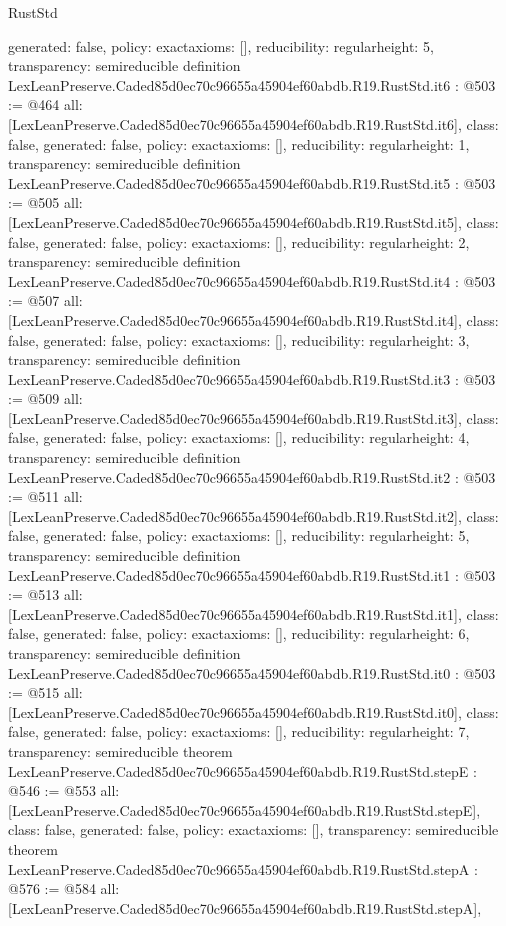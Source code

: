\begin{lexlean}{RustStd}
\begin{coremodule}
{  generated: false,
  policy: exact{axioms: []},
  reducibility: regular{height: 5},
  transparency: semireducible
}
definition LexLeanPreserve.Caded85d0ec70c96655a45904ef60abdb.R19.RustStd.it6 : @503 := @464 {
  all: [LexLeanPreserve.Caded85d0ec70c96655a45904ef60abdb.R19.RustStd.it6],
  class: false,
  generated: false,
  policy: exact{axioms: []},
  reducibility: regular{height: 1},
  transparency: semireducible
}
definition LexLeanPreserve.Caded85d0ec70c96655a45904ef60abdb.R19.RustStd.it5 : @503 := @505 {
  all: [LexLeanPreserve.Caded85d0ec70c96655a45904ef60abdb.R19.RustStd.it5],
  class: false,
  generated: false,
  policy: exact{axioms: []},
  reducibility: regular{height: 2},
  transparency: semireducible
}
definition LexLeanPreserve.Caded85d0ec70c96655a45904ef60abdb.R19.RustStd.it4 : @503 := @507 {
  all: [LexLeanPreserve.Caded85d0ec70c96655a45904ef60abdb.R19.RustStd.it4],
  class: false,
  generated: false,
  policy: exact{axioms: []},
  reducibility: regular{height: 3},
  transparency: semireducible
}
definition LexLeanPreserve.Caded85d0ec70c96655a45904ef60abdb.R19.RustStd.it3 : @503 := @509 {
  all: [LexLeanPreserve.Caded85d0ec70c96655a45904ef60abdb.R19.RustStd.it3],
  class: false,
  generated: false,
  policy: exact{axioms: []},
  reducibility: regular{height: 4},
  transparency: semireducible
}
definition LexLeanPreserve.Caded85d0ec70c96655a45904ef60abdb.R19.RustStd.it2 : @503 := @511 {
  all: [LexLeanPreserve.Caded85d0ec70c96655a45904ef60abdb.R19.RustStd.it2],
  class: false,
  generated: false,
  policy: exact{axioms: []},
  reducibility: regular{height: 5},
  transparency: semireducible
}
definition LexLeanPreserve.Caded85d0ec70c96655a45904ef60abdb.R19.RustStd.it1 : @503 := @513 {
  all: [LexLeanPreserve.Caded85d0ec70c96655a45904ef60abdb.R19.RustStd.it1],
  class: false,
  generated: false,
  policy: exact{axioms: []},
  reducibility: regular{height: 6},
  transparency: semireducible
}
definition LexLeanPreserve.Caded85d0ec70c96655a45904ef60abdb.R19.RustStd.it0 : @503 := @515 {
  all: [LexLeanPreserve.Caded85d0ec70c96655a45904ef60abdb.R19.RustStd.it0],
  class: false,
  generated: false,
  policy: exact{axioms: []},
  reducibility: regular{height: 7},
  transparency: semireducible
}
theorem LexLeanPreserve.Caded85d0ec70c96655a45904ef60abdb.R19.RustStd.stepE : @546 := @553 {
  all: [LexLeanPreserve.Caded85d0ec70c96655a45904ef60abdb.R19.RustStd.stepE],
  class: false,
  generated: false,
  policy: exact{axioms: []},
  transparency: semireducible
}
theorem LexLeanPreserve.Caded85d0ec70c96655a45904ef60abdb.R19.RustStd.stepA : @576 := @584 {
  all: [LexLeanPreserve.Caded85d0ec70c96655a45904ef60abdb.R19.RustStd.stepA],
}
\end{coremodule}
\end{lexlean}
